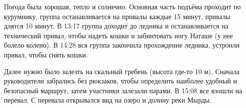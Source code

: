  Погода была хорошая, тепло и солнечно. Основная часть подъёма проходит по курумнику, группа останавливается на привалы каждые 15 минут, привалы длятся 10 минут. В 13:17 группа доходит до ледника и останавливается на технический привал, чтобы надеть кошки и забинтовать ногу Наташе (у нее болело колено). В 14:28 вся группа закончила прохождение ледника, устроили привал, чтобы снять кошки.        

Далее нужно было залезть на скальный гребень (высота где-то 10 м). Сначала руководители забрались без рюкзаков, чтобы определить наиболее удобный и безопасный маршрут, затем участники залезали парами. В 15:08 все взошли на перевал. С перевала открывался вид на озеро и долину реки Мырды.











\newpage
